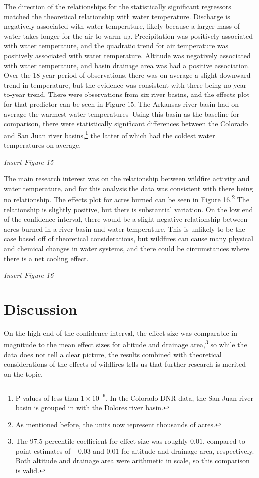 \documentclass[
]{article}
\begin{document}
The direction of the relationships for the statistically significant
regressors matched the theoretical relationship with water temperature.
Discharge is negatively associated with water temperature, likely
because a larger mass of water takes longer for the air to warm up.
Precipitation was positively associated with water temperature, and the
quadratic trend for air temperature was positively associated with water
temperature. Altitude was negatively associated with water temperature,
and basin drainage area was had a positive association. Over the 18 year
period of observations, there was on average a slight downward trend in
temperature, but the evidence was consistent with there being no
year-to-year trend. There were observations from six river basins, and
the effects plot for that predictor can be seen in Figure 15. The
Arkansas river basin had on average the warmest water temperatures.
Using this basin as the baseline for comparison, there were
statistically significant differences between the Colorado and San Juan
river basins,\footnote{P-values of less than \(1\times 10^{-6}\). In the
  Colorado DNR data, the San Juan river basin is grouped in with the
  Dolores river basin.} the latter of which had the coldest water
temperatures on average.

\emph{Insert Figure 15}

The main research interest was on the relationship between wildfire
activity and water temperature, and for this analysis the data was
consistent with there being no relationship. The effects plot for acres
burned can be seen in Figure 16.\footnote{As mentioned before, the units
  now represent thousands of acres.} The relationship is slightly
positive, but there is substantial variation. On the low end of the
confidence interval, there would be a slight negative relationship
between acres burned in a river basin and water temperature. This is
unlikely to be the case based off of theoretical considerations, but
wildfires can cause many physical and chemical changes in water systems,
and there could be circumstances where there is a net cooling effect.

\emph{Insert Figure 16}

\hypertarget{discussion}{%
\section{Discussion}\label{discussion}}

On the high end of the confidence interval, the effect size was
comparable in magnitude to the mean effect sizes for altitude and
drainage area,\footnote{The 97.5 percentile coefficient for effect size
  was roughly \(0.01\), compared to point estimates of \(-0.03\) and
  \(0.01\) for altitude and drainage area, respectively. Both altitude
  and drainage area were arithmetic in scale, so this comparison is
  valid.} so while the data does not tell a clear picture, the results
combined with theoretical considerations of the effects of wildfires
tells us that further research is merited on the topic.
\end{document}
